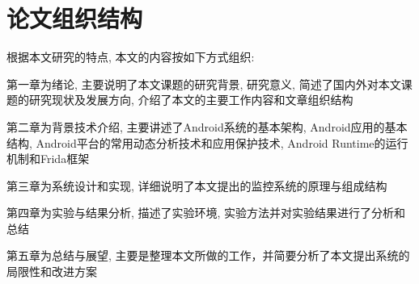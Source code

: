 \section{论文组织结构}
根据本文研究的特点, 本文的内容按如下方式组织:

第一章为绪论, 主要说明了本文课题的研究背景, 研究意义, 简述了国内外对本文课题的研究现状及发展方向, 介绍了本文的主要工作内容和文章组织结构\juhao 

第二章为背景技术介绍, 主要讲述了Android系统的基本架构, Android应用的基本结构, Android平台的常用动态分析技术和应用保护技术, Android Runtime的运行机制和Frida框架\juhao

第三章为系统设计和实现, 详细说明了本文提出的监控系统的原理与组成结构\juhao

第四章为实验与结果分析, 描述了实验环境, 实验方法并对实验结果进行了分析和总结\juhao

第五章为总结与展望, 主要是整理本文所做的工作，并简要分析了本文提出系统的局限性和改进方案\juhao

 